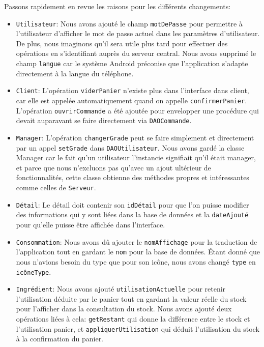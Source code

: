\documentclass[a4paper,10pt]{article}
\begin{document}
Passons rapidement en revue les raisons pour les différents changements:
\begin{itemize}
    \item \texttt{Utilisateur}: Nous avons ajouté le champ \texttt{motDePasse} pour permettre à l'utilisateur d'afficher le mot de passe actuel dans les paramètres d'utilisateur. De plus, nous imaginons qu'il sera utile plus tard pour effectuer des opérations en s'identifiant auprès du serveur central. Nous avons supprimé le champ \texttt{langue} car le système Android préconise que l'application s'adapte directement à la langue du téléphone.
    \item \texttt{Client}: L'opération \texttt{viderPanier} n'existe plus dans l'interface dans client, car elle est appelée automatiquement quand on appelle \texttt{confirmerPanier}. L'opération \texttt{ouvrirCommande} a été ajoutée pour envelopper une procédure qui devait auparavant se faire directement via \texttt{DAOCommande}.
    \item \texttt{Manager}: L'opération \texttt{changerGrade} peut se faire simplement et directement par un appel \texttt{setGrade} dans \texttt{DAOUtilisateur}. Nous avons gardé la classe Manager car le fait qu'un utilisateur l'instancie signifiait qu'il était manager, et parce que nous n'excluons pas qu'avec un ajout ultérieur de fonctionnalités, cette classe obtienne des méthodes propres et intéressantes comme celles de \texttt{Serveur}.
    \item \texttt{Détail}: Le détail doit contenir son \texttt{idDétail} pour que l'on puisse modifier des informations qui y sont liées dans la base de données et la \texttt{dateAjouté} pour qu'elle puisse être affichée dans l'interface.
    \item \texttt{Consommation}: Nous avons dû ajouter le \texttt{nomAffichage} pour la traduction de l'application tout en gardant le \texttt{nom} pour la base de données. Étant donné que nous n'avions besoin du type que pour son icône, nous avons changé \texttt{type} en \texttt{icôneType}.
    \item \texttt{Ingrédient}: Nous avons ajouté \texttt{utilisationActuelle} pour retenir l'utilisation déduite par le panier tout en gardant la valeur réelle du stock pour l'afficher dans la consultation du stock. Nous avons ajouté deux opérations liées à cela: \texttt{getRestant} qui donne la différence entre le stock et l'utilisation panier, et \texttt{appliquerUtilisation} qui déduit l'utilisation du stock à la confirmation du panier.
\end{itemize}
\end{document}
